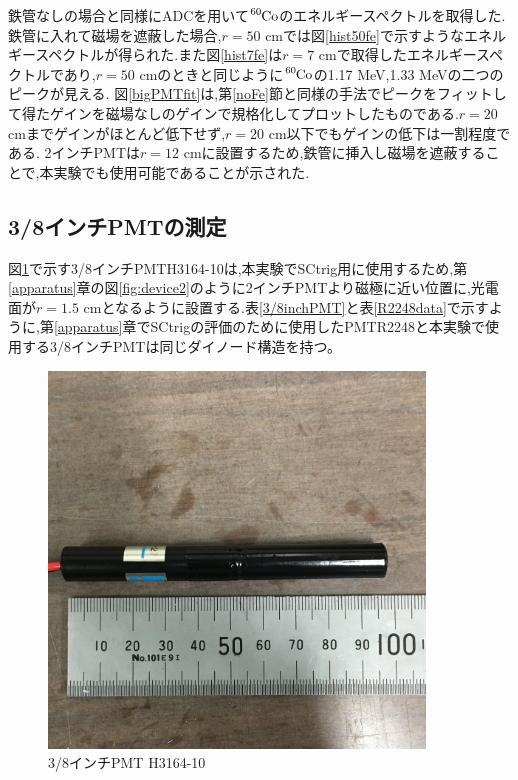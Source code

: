 鉄管なしの場合と同様にADCを用いて$\ce{^{60}Co}$のエネルギースペクトルを取得した.
鉄管に入れて磁場を遮蔽した場合,$r=50$ cmでは図\ref{hist50fe}で示すようなエネルギースペクトルが得られた.また図\ref{hist7fe}は$r=7$ cmで取得したエネルギースペクトルであり,$r=50$ cmのときと同じように$\ce{^{60}Co}$の1.17 MeV,1.33 MeVの二つのピークが見える.
図\ref{bigPMTfit}は,第\ref{noFe}節と同様の手法でピークをフィットして得たゲインを磁場なしのゲインで規格化してプロットしたものである.$r=20$ cmまでゲインがほとんど低下せず,$r=20$ cm以下でもゲインの低下は一割程度である.
2インチPMTは$r=12$ cmに設置するため,鉄管に挿入し磁場を遮蔽することで,本実験でも使用可能であることが示された.


\subsection{3/8インチPMTの測定}
図\ref{3/8inch}で示す3/8インチPMT\hspace{3pt}H3164-10\cite{pmtH3164-10}は,本実験でSCtrig用に使用するため,第\ref{apparatus}章の図\ref{fig:device2}のように2インチPMTより磁極に近い位置に,光電面が$r=1.5$ cmとなるように設置する.表\ref{3/8inchPMT}と表\ref{R2248data}で示すように,第\ref{apparatus}章でSCtrigの評価のために使用したPMT\hspace{3pt}R2248\cite{pmtR2248}と本実験で使用する3/8インチPMT\cite{pmtH3164-10}は同じダイノード構造を持つ。

\begin{figure}[tbp]
	\centering
		\includegraphics[width=10cm]{fig/iguchi/miniPMT.jpg}
	\caption{3/8インチPMT H3164-10}
	\label{3/8inch}
\end{figure}


